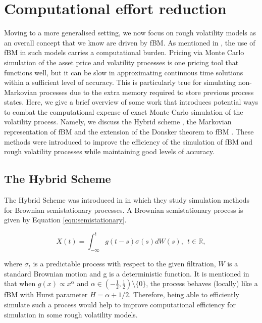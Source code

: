 \documentclass[12pt,oneside]{article}
\begin{document}
\section{Computational effort reduction}
\label{sec:comp_advancement}
Moving to a more generalised setting, we now focus on rough volatility models as an overall concept that we know are driven by fBM. As mentioned in \cite{Jacquier2020}, the use of fBM in such models carries a computational burden. Pricing via Monte Carlo simulation of the asset price and volatility processes is one pricing tool that functions well, but it can be slow in approximating continuous time solutions within a sufficient level of accuracy. This is particularly true for simulating non-Markovian processes due to the extra memory required to store previous process states. Here, we give a brief overview of some work that introduces potential ways to combat the computational expense of exact Monte Carlo simulation of the volatility process. Namely, we discuss the Hybrid scheme \cite{Bennedsen2017}, the Markovian representation of fBM \cite{Harms2020} and the extension of the Donsker theorem to fBM \cite{Horvath2019}. These methods were introduced to improve the efficiency of the simulation of fBM and rough volatility processes while maintaining good levels of accuracy.

\subsection{The Hybrid Scheme}
\label{subsec:hybrid_scheme}
The Hybrid Scheme was introduced in \cite{Bennedsen2017} in which they study simulation methods for Brownian semistationary processes. A Brownian semistationary process is given by Equation \ref{eqn:semistationary}. 

\begin{equation}
\label{eqn:semistationary}
X(t)=\int_{-\infty}^t g(t-s) \sigma(s) dW(s),  \ \  t\in\mathbb{R},
\end{equation}

where $\sigma_t$ is a predictable process with respect to the given filtration, $W$ is a standard Brownian motion and g is a deterministic function. It is mentioned in \cite{Bennedsen2017} that when $g(x) \propto x^\alpha$ and $\alpha \in (-\frac{1}{2}, \frac{1}{2}) \setminus \{0\}$, the process behaves (locally) like a fBM with Hurst parameter $H=\alpha+1/2$.  Therefore, being able to efficiently simulate such a process would help to improve computational efficiency for simulation in some rough volatility models.  
\end{document}
